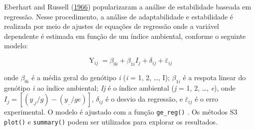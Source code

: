 \documentclass[
]{book}
\makeatletter
\numberwithin{equation}{section}
\newcommand{\indf}[1]{\index[function]{#1@\texttt{#1()}|ST}}
\makeatother
\begin{document}
Eberhart and Russell (\protect\hyperlink{ref-Eberhart1966}{1966}) popularizaram a análise de estabilidade baseada em regressão. Nesse procedimento, a análise de adaptabilidade e estabilidade é realizada por meio de ajustes de equações de regressão onde a variável dependente é estimada em função de um índice ambiental, conforme o seguinte modelo:

\[
\mathop Y\nolimits_{ij}  = {\beta _{0i}} + {\beta _{1i}}{I_j} + {\delta _{ij}} + {\bar \varepsilon _{ij}}
\]

onde \({\beta _{0i}}\) é a média geral do genótipo \emph{i} (\emph{i} = 1, 2, \ldots, I); \({\beta _{1i}}\) é a respota linear do genótipo \emph{i} ao índice ambiental; \emph{Ij} é o índice ambiental (\emph{j} = 1, 2, \ldots, \emph{e}), onde \({I_j} = [(y_{.j}/g)- (y_{..}/ge)]\), \({\delta _{ij}}\) é o desvio da regressão, e \({\bar \varepsilon _{ij}}\) é o erro experimental.
O modelo é ajustado com a função \texttt{ge\_reg()} \indf{ge\_reg}. Os métodos S3 \texttt{plot()} e \texttt{summary()} podem ser utilizados para explorar os resultados.
\end{document}
